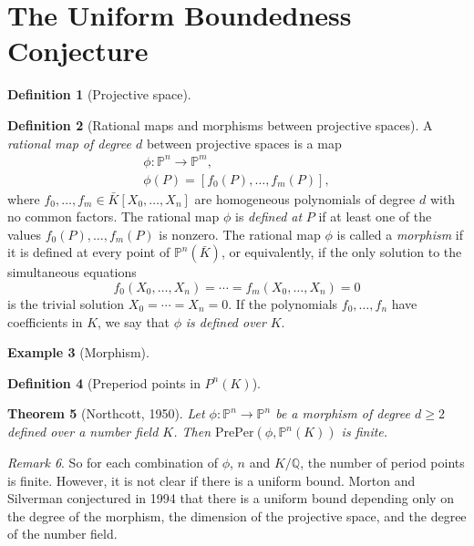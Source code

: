 \documentclass{amsart}
\theoremstyle{plain}
\newtheorem{theorem}{Theorem}[section]
\theoremstyle{definition}
\newtheorem{definition}[theorem]{Definition}
\newtheorem{example}[theorem]{Example}
\theoremstyle{remark}
\newtheorem{remark}[theorem]{Remark}
\renewcommand{\P}{\mathbb{P}}
\newcommand{\Q}{\mathbb{Q}}
\newcommand{\preper}{\mathrm{PrePer}}
\begin{document}
\section{The Uniform Boundedness Conjecture}

\begin{definition}[Projective space]
\end{definition}

\begin{definition}[Rational maps and morphisms between projective spaces]
  A \emph{rational map of degree $d$} between projective spaces is a
  map
  \[
  \begin{gathered}
    \phi: \P^n \to \P^m,\\
    \phi(P) = [f_0(P), \dots, f_m(P)],
  \end{gathered}
  \]
  where $f_0, \dots, f_m \in \bar{K}[X_0, \dots, X_n]$ are homogeneous
  polynomials of degree $d$ with no common factors. The rational map
  $\phi$ is \emph{defined at} $P$ if at least one of the values
  $f_0(P), \dots, f_m(P)$ is nonzero. The rational map $\phi$ is
  called a \emph{morphism} if it is defined at every point of
  $\P^n(\bar{K})$, or equivalently, if the only solution to the
  simultaneous equations
  \[
  f_0(X_0, \dots, X_n) = \cdots = f_m(X_0, \dots, X_n) = 0
  \]
  is the trivial solution $X_0 = \cdots = X_n = 0$. If the polynomials
  $f_0, \dots, f_n$ have coefficients in $K$, we say that $\phi$
  \emph{is defined over} $K$.
\end{definition}

\begin{example}[Morphism]
\end{example}

\begin{definition}[Preperiod points in $P^n(K)$]
\end{definition}

\begin{theorem}[Northcott, 1950]
  Let $\phi: \P^n \to \P^n$ be a morphism of degree $d \ge 2$ defined
  over a number field $K$. Then $\preper(\phi, \P^n(K))$ is finite.
\end{theorem}

\begin{remark}
  So for each combination of $\phi$, $n$ and $K/\Q$, the number of
  period points is finite. However, it is not clear if there is a
  uniform bound. Morton and Silverman conjectured in 1994 that there
  is a uniform bound depending only on the degree of the morphism, the
  dimension of the projective space, and the degree of the number
  field.
\end{remark}
\end{document}
